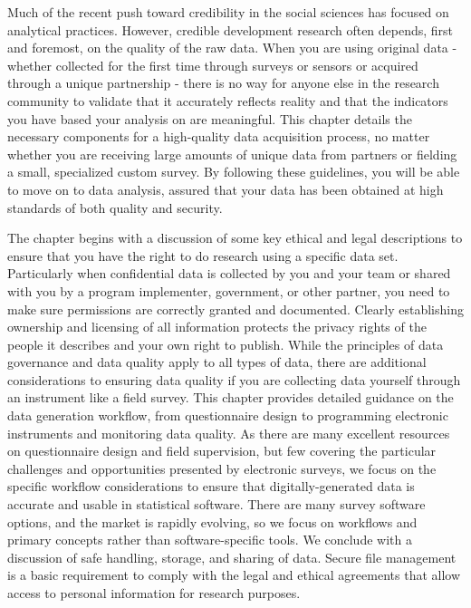 
\begin{fullwidth}
Much of the recent push toward credibility in the social sciences has focused on analytical practices.
However, credible development research often depends, first and foremost, on the quality of the raw data.
When you are using original data - whether collected for the first time through surveys or sensors or acquired through a unique partnership -
there is no way for anyone else in the research community to validate that it accurately reflects reality
and that the indicators you have based your analysis on are meaningful.
This chapter details the necessary components for a high-quality data acquisition process,
no matter whether you are receiving large amounts of unique data from partners
or fielding a small, specialized custom survey. By following these guidelines, you will be able to move on to data analysis,
assured that your data has been obtained at high standards of both quality and security.

The chapter begins with a discussion of some key ethical and legal descriptions
to ensure that you have the right to do research using a specific data set.
Particularly when confidential data is collected by you and your team
or shared with you by a program implementer, government, or other partner,
you need to make sure permissions are correctly granted and documented.
Clearly establishing ownership and licensing of all information protects 
the privacy rights of the people it describes and your own right to publish.
While the principles of data governance and data quality apply to all types of data,
there are additional considerations to ensuring data quality if you are
collecting data yourself through an instrument like a field survey.
This chapter provides detailed guidance on the data generation workflow,
from questionnaire design to programming electronic instruments and monitoring data quality.
As there are many excellent resources on questionnaire design and field supervision,
but few covering the particular challenges and opportunities presented by electronic surveys,
we focus on the specific workflow considerations to ensure that 
digitally-generated data is accurate and usable in statistical software.
There are many survey software options, and the market is rapidly evolving,
so we focus on workflows and primary concepts rather than software-specific tools.
We conclude with a discussion of safe handling, storage, and sharing of data.
Secure file management is a basic requirement
to comply with the legal and ethical agreements that allow
 access to personal information for research purposes.


\end{fullwidth}

